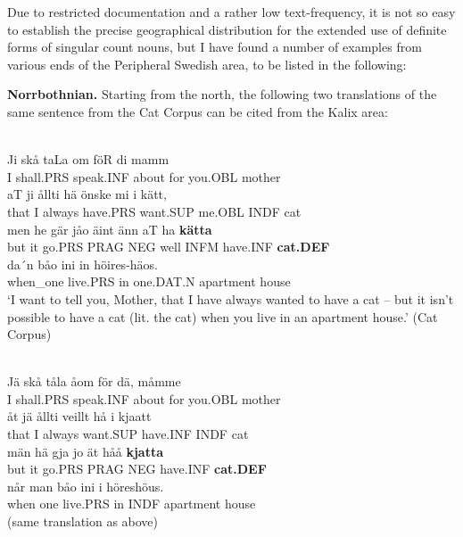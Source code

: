 \z

Due to restricted documentation and a rather low text-frequency, it is not so easy to establish the precise geographical distribution for the extended use of definite forms of singular count nouns, but I have found a number of examples from various ends of the Peripheral Swedish area, to be listed in the following: 

\textbf{Norrbothnian.} Starting from the north, the following two translations of the same sentence from the Cat Corpus can be cited from the Kalix area:

\ea\label{}
\\
\gll Ji  skå  taLa  om  föR  di  mamm\\
I  shall.PRS  speak.INF  about  for  you.OBL  mother\\
\gll aT  ji  ållti  hä  önske  mi  i  kätt,\\
that  I  always  have.PRS  want.SUP  me.OBL  INDF  cat\\
\gll men  he  gär  jåo  äint  änn  aT  ha  \textbf{kätta}\\
but  it  go.PRS  PRAG  NEG  well  INFM  have.INF  \textbf{cat.DEF}\\
\gll da´n  båo  ini  in  höires-häos.\\
when\_one  live.PRS  in  one.DAT.N  apartment house\\
\glt ‘I want to tell you, Mother, that I have always wanted to have a cat – but it isn’t possible to have a cat (lit. the cat) when you live in an apartment house.’ (Cat Corpus)

\z

\ea\label{}
\\
\gll Jä  skå  tåla  åom  för  dä,  måmme\\
I  shall.PRS  speak.INF  about  for  you.OBL  mother\\
\gll åt  jä  ållti  veillt  hå  i  kjaatt\\
that  I  always  want.SUP  have.INF  INDF  cat  \\
\gll män  hä  gja  jo  ät  håå  \textbf{kjatta}\\
but  it  go.PRS  PRAG  NEG  have.INF  \textbf{cat.DEF}\\
\gll når  man  båo   ini  i  höreshöus.\\
when  one  live.PRS  in  INDF  apartment house\\
\glt (same translation as above)

\z

